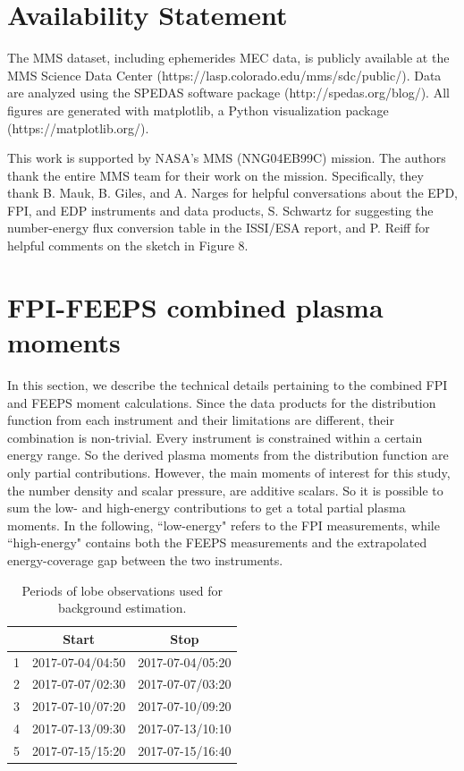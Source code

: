 \documentclass[draft]{agujournal2019}
\begin{document}
\section*{Availability Statement}

The MMS dataset, including ephemerides MEC data, is publicly available at the MMS Science Data Center (https://lasp.colorado.edu/mms/sdc/public/). Data are analyzed using the SPEDAS software package (http://spedas.org/blog/). All figures are generated with matplotlib, a Python visualization package (https://matplotlib.org/).

\acknowledgments

This work is supported by NASA’s MMS (NNG04EB99C) mission. The authors thank the entire MMS team for their work on the mission. Specifically, they thank B. Mauk, B. Giles, and A. Narges for helpful conversations about the EPD, FPI, and EDP instruments and data products, S. Schwartz for suggesting the number-energy flux conversion table in the ISSI/ESA report, and P. Reiff for helpful comments on the sketch in Figure 8.

\appendix
\section{FPI-FEEPS combined plasma moments}\label{appendix:combined_plasma_moments}

In this section, we describe the technical details pertaining to the combined FPI and FEEPS moment calculations. Since the data products for the distribution function from each instrument and their limitations are different, their combination is non-trivial. Every instrument is constrained within a certain energy range. So the derived plasma moments from the distribution function are only partial contributions. However, the main moments of interest for this study, the number density and scalar pressure, are additive scalars. So it is possible to sum the low- and high-energy contributions to get a total partial plasma moments. In the following, ``low-energy" refers to the FPI measurements, while ``high-energy" contains both the FEEPS measurements and the extrapolated energy-coverage gap between the two instruments.

\begin{table}
\caption{Periods of lobe observations used for background estimation.}
\label{tab:lobe_periods}
\centering
\begin{tabular}{c c c}
\hline
     & Start & Stop \\
\hline
    1 & 2017-07-04/04:50 & 2017-07-04/05:20\\
    2 & 2017-07-07/02:30 & 2017-07-07/03:20\\
    3 & 2017-07-10/07:20 & 2017-07-10/09:20\\
    4 & 2017-07-13/09:30 & 2017-07-13/10:10\\
    5 & 2017-07-15/15:20 & 2017-07-15/16:40\\
\hline
\end{tabular}
\end{table}
\end{document}
